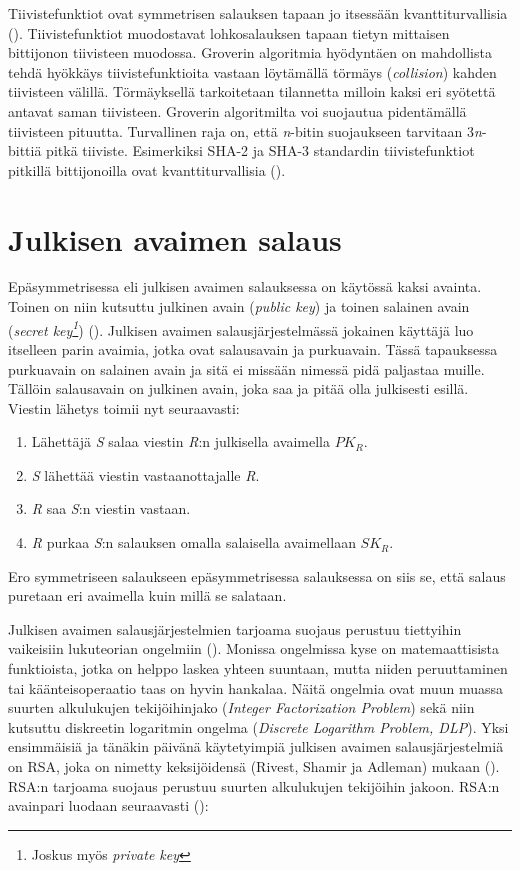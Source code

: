  Tiivistefunktiot ovat symmetrisen salauksen tapaan jo itsessään kvanttiturvallisia (\cite{mavroeidis2018impact}). Tiivistefunktiot muodostavat lohkosalauksen tapaan tietyn mittaisen bittijonon tiivisteen muodossa. Groverin algoritmia hyödyntäen on mahdollista tehdä hyökkäys tiivistefunktioita vastaan löytämällä törmäys (\emph{collision}) kahden tiivisteen välillä. Törmäyksellä tarkoitetaan tilannetta milloin kaksi eri syötettä antavat saman tiivisteen. Groverin algoritmilta voi suojautua pidentämällä tiivisteen pituutta. Turvallinen raja on, että \emph{n}-bitin suojaukseen tarvitaan 3\emph{n}-bittiä pitkä tiiviste. Esimerkiksi SHA-2 ja SHA-3 standardin tiivistefunktiot pitkillä bittijonoilla ovat kvanttiturvallisia (\cite{mavroeidis2018impact}).
 
 \section{Julkisen avaimen salaus}
 Epäsymmetrisessa eli julkisen avaimen salauksessa on käytössä kaksi avainta. Toinen on niin kutsuttu julkinen avain (\emph{public key}) ja toinen salainen avain (\emph{secret key\footnote{Joskus myös \emph{private key}}}) (\cite{bellare2005introduction}). Julkisen avaimen salausjärjestelmässä jokainen käyttäjä luo itselleen parin avaimia, jotka ovat salausavain ja purkuavain. Tässä tapauksessa purkuavain on salainen avain ja sitä ei missään nimessä pidä paljastaa muille. Tällöin salausavain on julkinen avain, joka saa ja pitää olla julkisesti esillä. Viestin lähetys toimii nyt seuraavasti:
 
 \begin{enumerate}
     \item Lähettäjä \emph{S} salaa viestin \emph{R}:n julkisella avaimella $PK_{R}$.
     \item \emph{S} lähettää viestin vastaanottajalle \emph{R}.
     \item \emph{R} saa \emph{S}:n viestin vastaan.
     \item \emph{R} purkaa \emph{S}:n salauksen omalla salaisella avaimellaan $SK_{R}$.
 \end{enumerate}
Ero symmetriseen salaukseen epäsymmetrisessa salauksessa on siis se, että salaus puretaan eri avaimella kuin millä se salataan.
 
  Julkisen avaimen salausjärjestelmien tarjoama suojaus perustuu tiettyihin vaikeisiin lukuteorian ongelmiin (\cite{mavroeidis2018impact}). Monissa ongelmissa kyse on matemaattisista funktioista, jotka on helppo laskea yhteen suuntaan, mutta niiden peruuttaminen tai käänteisoperaatio taas on hyvin hankalaa. Näitä ongelmia ovat muun muassa suurten alkulukujen tekijöihinjako (\emph{Integer Factorization Problem}) sekä niin kutsuttu diskreetin logaritmin ongelma (\emph{Discrete Logarithm Problem, DLP}).
  Yksi ensimmäisiä ja tänäkin päivänä käytetyimpiä julkisen avaimen salausjärjestelmiä on RSA, joka on nimetty keksijöidensä (Rivest, Shamir ja Adleman) mukaan (\cite{montgomery1994survey}). RSA:n tarjoama suojaus perustuu suurten alkulukujen tekijöihin jakoon. RSA:n avainpari luodaan seuraavasti  (\cite{10.1145/359340.359342}):
  
